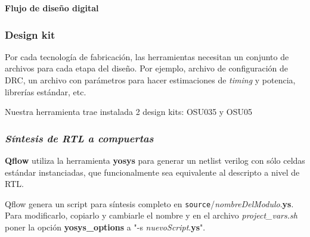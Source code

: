 \documentclass{beamer}
\begin{document}
\begin{frame}
\textbf{Flujo de diseño digital} 
   \begin{figure}[ht]
      \centering
    \end{figure}
\end{frame}


\begin{frame}
\frametitle{Design kit}
Por cada tecnología de fabricación, las herramientas necesitan un conjunto de archivos para cada etapa del diseño. Por ejemplo, archivo de configuración de DRC, un archivo con parámetros para hacer estimaciones de  \emph{timing} y potencia, librerías estándar, etc.

Nuestra herramienta trae instalada 2 design kits: OSU035 y OSU05


\end{frame}
\begin{frame}[fragile]
  \frametitle{\emph{Síntesis de RTL a compuertas}}
  \textbf{Qflow} utiliza la herramienta \textbf{yosys} para generar un netlist verilog con sólo celdas estándar instanciadas, que funcionalmente sea equivalente al descripto a nivel de RTL.

  Qflow genera un script para síntesis completo en \verb.source./\emph{nombreDelModulo}.\textbf{ys}. Para modificarlo, copiarlo y cambiarle el nombre y en el archivo \emph{project\_vars.sh} poner la opción \textbf{yosys\_options} a "-s \emph{nuevoScript}.\textbf{ys}".

 
\end{frame}
\end{document}
